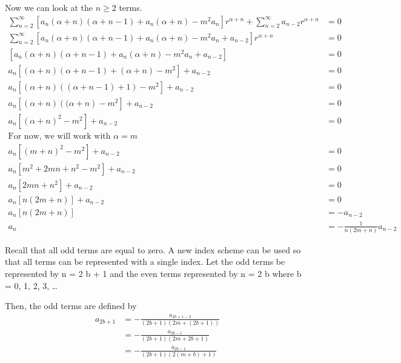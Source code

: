 \documentclass[11pt]{article}
\begin{document}
Now we can look at the \(n \geq 2\) terms. \begin{equation}
\begin{split}
\sum_{n=2}^{\infty} \left[ a_{n} (\alpha + n) (\alpha + n - 1)  +
a_{n} (\alpha + n) - m^2 a_n  \right] r^{\alpha + n} + \sum_{n=2}^{\infty}{a_{n-2} r^{\alpha + n}} &= 0 \\
\sum_{n=2}^{\infty} \left[ a_{n} (\alpha + n) (\alpha + n - 1)  +
a_{n} (\alpha + n) - m^2 a_n  + {a_{n-2}}\right]r^{\alpha + n} &= 0 \\
\left[ a_{n} (\alpha + n) (\alpha + n - 1)  + a_{n} (\alpha + n) - m^2 a_n  + {a_{n-2}}\right] &= 0 \\
a_{n} \left[(\alpha + n) (\alpha + n - 1) + (\alpha + n) - m^2 \right]  + {a_{n-2}} &= 0 \\
a_{n} \left[(\alpha + n) \left((\alpha + n - 1) + 1 \right) - m^2 \right]  + {a_{n-2}} &= 0 \\
a_{n} \left[(\alpha + n) \left((\alpha + n \right) - m^2 \right]  + {a_{n-2}} &= 0 \\
a_{n} \left[(\alpha + n)^2 - m^2 \right]  + {a_{n-2}} &= 0 \\
\text{For now, we will work with $\alpha = m$} \\
a_{n} \left[(m + n)^2 - m^2 \right]  + {a_{n-2}} &= 0 \\
a_{n} \left[m^2 + 2 m n + n^2 - m^2 \right]  + {a_{n-2}} &= 0 \\
a_{n} \left[2 m n + n^2 \right]  + {a_{n-2}} &= 0 \\
a_{n} \left[n (2 m + n) \right]  + {a_{n-2}} &= 0 \\
a_{n} \left[n (2 m + n) \right]  &= - {a_{n-2}}  \\
a_{n} &= - \frac{1}{n (2 m + n)} a_{n-2}
\end{split}
\end{equation}

Recall that all odd terms are equal to zero. A new index scheme can be
used so that all terms can be represented with a single index. Let the
odd terms be represented by n = 2 b + 1 and the even terms represented
by n = 2 b where b = 0, 1, 2, 3, \ldots{}

Then, the odd terms are defined by \begin{equation}
\begin{split}
a_{2b + 1} &= - \frac{a_{2 b + 1 - 2}}{(2b + 1)(2 m + ( 2 b + 1))} \\
&= - \frac{a_{2 b - 1}}{(2b + 1)(2 m + 2 b + 1)} \\
&= - \frac{a_{2 b - 1}}{(2b + 1)(2 (m + b) + 1)}
\end{split}
\end{equation}
\end{document}

